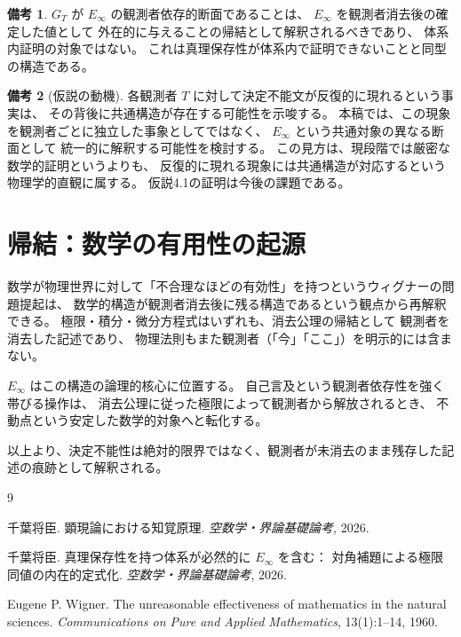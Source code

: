 \documentclass[11pt,a4paper]{article}
\theoremstyle{definition}
\newtheorem{remark}{備考}[section]
\newcommand{\Einfty}{E_\infty}
\begin{document}
\begin{remark}
$G_T$ が $\Einfty$ の観測者依存的断面であることは、
$\Einfty$ を観測者消去後の確定した値として
外在的に与えることの帰結として解釈されるべきであり、
体系内証明の対象ではない。
これは真理保存性が体系内で証明できないことと同型の構造である。
\end{remark}

\begin{remark}[仮説の動機]
各観測者 $T$ に対して決定不能文が反復的に現れるという事実は、
その背後に共通構造が存在する可能性を示唆する。
本稿では、この現象を観測者ごとに独立した事象としてではなく、
$\Einfty$ という共通対象の異なる断面として
統一的に解釈する可能性を検討する。
この見方は、現段階では厳密な数学的証明というよりも、
反復的に現れる現象には共通構造が対応するという物理学的直観に属する。
仮説4.1の証明は今後の課題である。
\end{remark}

\section{帰結：数学の有用性の起源}

数学が物理世界に対して「不合理なほどの有効性」を持つというウィグナーの問題提起は、
数学的構造が観測者消去後に残る構造であるという観点から再解釈できる\cite{Wigner1960}。
極限・積分・微分方程式はいずれも、消去公理の帰結として
観測者を消去した記述であり、
物理法則もまた観測者（「今」「ここ」）を明示的には含まない。

$\Einfty$ はこの構造の論理的核心に位置する。
自己言及という観測者依存性を強く帯びる操作は、
消去公理に従った極限によって観測者から解放されるとき、
不動点という安定した数学的対象へと転化する。

以上より、決定不能性は絶対的限界ではなく、観測者が未消去のまま残存した記述の痕跡として解釈される。

\begin{thebibliography}{9}

千葉将臣.
\newblock 顕現論における知覚原理.
\newblock \emph{空数学・界論基礎論考}, 2026.

千葉将臣.
\newblock 真理保存性を持つ体系が必然的に $E_\infty$ を含む：
対角補題による極限同値の内在的定式化.
\newblock \emph{空数学・界論基礎論考}, 2026.

Eugene P. Wigner.
\newblock The unreasonable effectiveness of mathematics in the natural sciences.
\newblock \emph{Communications on Pure and Applied Mathematics}, 13(1):1--14, 1960.

\end{thebibliography}
\end{document}
